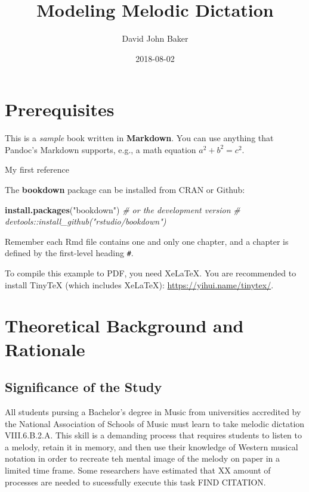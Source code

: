 \documentclass[]{book}
\title{Modeling Melodic Dictation}
\author{David John Baker}
\date{2018-08-02}
\newenvironment{Shaded}{\begin{snugshade}}{\end{snugshade}}
\newcommand{\CommentTok}[1]{\textcolor[rgb]{0.56,0.35,0.01}{\textit{#1}}}
\newcommand{\KeywordTok}[1]{\textcolor[rgb]{0.13,0.29,0.53}{\textbf{#1}}}
\newcommand{\NormalTok}[1]{#1}
\newcommand{\StringTok}[1]{\textcolor[rgb]{0.31,0.60,0.02}{#1}}
\theoremstyle{definition}
\theoremstyle{definition}
\theoremstyle{definition}
\theoremstyle{remark}
\begin{document}
\maketitle

{
\setcounter{tocdepth}{1}
\tableofcontents
}
\hypertarget{prerequisites}{%
\chapter{Prerequisites}\label{prerequisites}}

This is a \emph{sample} book written in \textbf{Markdown}. You can use
anything that Pandoc's Markdown supports, e.g., a math equation
\(a^2 + b^2 = c^2\).

My first reference \citep{margulisModelMelodicExpectation2005}

The \textbf{bookdown} package can be installed from CRAN or Github:

\begin{Shaded}
\begin{Highlighting}[]
\KeywordTok{install.packages}\NormalTok{(}\StringTok{"bookdown"}\NormalTok{)}
\CommentTok{# or the development version}
\CommentTok{# devtools::install_github("rstudio/bookdown")}
\end{Highlighting}
\end{Shaded}

Remember each Rmd file contains one and only one chapter, and a chapter
is defined by the first-level heading \texttt{\#}.

To compile this example to PDF, you need XeLaTeX. You are recommended to
install TinyTeX (which includes XeLaTeX):
\url{https://yihui.name/tinytex/}.

\hypertarget{intro}{%
\chapter{Theoretical Background and Rationale}\label{intro}}

\hypertarget{significance-of-the-study}{%
\section{Significance of the Study}\label{significance-of-the-study}}

All students pursing a Bachelor's degree in Music from universities
accredited by the National Association of Schools of Music must learn to
take melodic dictation \citep{NASM201718HandbookPdf2018} VIII.6.B.2.A.
This skill is a demanding process that requires students to listen to a
melody, retain it in memory, and then use their knowledge of Western
musical notation in order to recreate teh mental image of the melody on
paper in a limited time frame. Some researchers have estimated that XX
amount of processes are needed to sucessfully execute this task FIND
CITATION.
\end{document}
